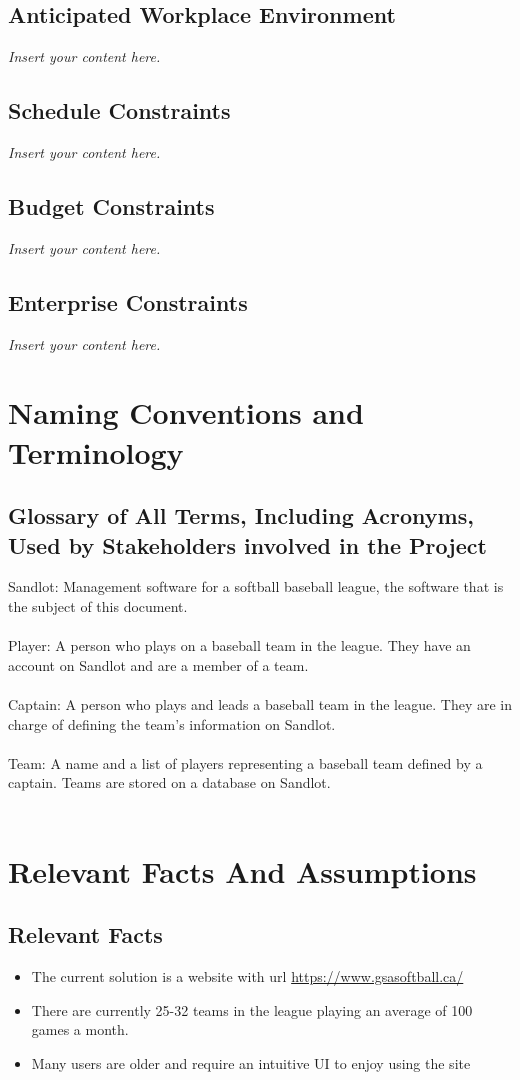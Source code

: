 \documentclass[12pt]{article}
\newcommand{\lips}{\textit{Insert your content here.}}
\begin{document}
\subsection{Anticipated Workplace Environment}
\lips
\subsection{Schedule Constraints}
\lips
\subsection{Budget Constraints}
\lips
\subsection{Enterprise Constraints}
\lips

\section{Naming Conventions and Terminology}
\subsection{Glossary of All Terms, Including Acronyms, Used by Stakeholders
involved in the Project}
Sandlot: Management software for a softball baseball league, the software that
is the subject of this document.\\\\
Player: A person who plays on a baseball team in the league. They have an
account on Sandlot and are a member of a team.\\\\
Captain: A person who plays and leads a baseball team in the league. They are
in charge of defining the team's information on Sandlot.\\\\
Team: A name and a list of players representing a baseball team defined by a
captain. Teams are stored on a database on Sandlot.\\\\


\section{Relevant Facts And Assumptions}
\subsection{Relevant Facts}
\begin{itemize}
  \item The current solution is a website with url 
  \url{https://www.gsasoftball.ca/}
  \item There are currently 25-32 teams in the league playing an average of
  100 games a month.
  \item Many users are older and require an intuitive UI to enjoy using the
  site
\end{itemize}
\end{document}
